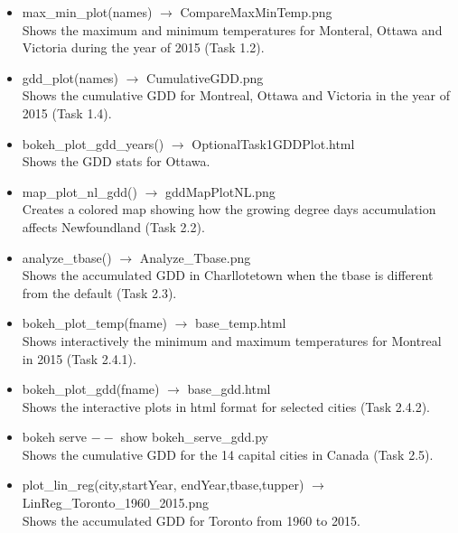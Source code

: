\documentclass[12pt]{article}
\begin{document}
\begin{description}
\begin{itemize}
\item max\_min\_plot(names) $\to$ CompareMaxMinTemp.png \\
Shows the maximum and minimum temperatures for Monteral, Ottawa and Victoria during the year of 2015 (Task 1.2).

\item gdd\_plot(names)  $\to$ CumulativeGDD.png \\
Shows the cumulative GDD for Montreal, Ottawa and Victoria in the year of 2015 (Task 1.4).

\item bokeh\_plot\_gdd\_years() $\to$ OptionalTask1GDDPlot.html \\
Shows the GDD stats for Ottawa. 

\item map\_plot\_nl\_gdd()  $\to$  gddMapPlotNL.png \\
Creates a colored map showing how the growing degree days accumulation affects Newfoundland (Task 2.2).

\item analyze\_tbase()  $\to$ Analyze\_Tbase.png \\
Shows the accumulated GDD in Charllotetown when the tbase is different from the default (Task 2.3).

\item bokeh\_plot\_temp(fname) $\to$ base\_temp.html \\
Shows interactively the minimum and maximum temperatures for Montreal in 2015 (Task 2.4.1).

\item bokeh\_plot\_gdd(fname) $\to$ base\_gdd.html \\
Shows the interactive plots in html format for selected cities (Task 2.4.2).

\item bokeh serve $--$ show bokeh\_serve\_gdd.py \\
Shows the cumulative GDD for the 14 capital cities in Canada (Task 2.5).

\item plot\_lin\_reg(city,startYear, endYear,tbase,tupper) $\to$ LinReg\_Toronto\_1960\_2015.png \\
Shows the accumulated GDD for Toronto from 1960 to 2015.


\end{itemize}
\end{description}
\end{document}
